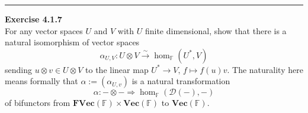 \documentclass[a4paper, 12pt]{article}
\newenvironment{problem}[2][Exercise]
    { \begin{mdframed}[backgroundcolor=gray!20] \textbf{#1 #2} \\}
    {  \end{mdframed}}
\begin{document}
\noindent\rule{7in}{2.8pt}
\begin{problem}{4.1.7}
For any vector spaces \(U\) and \(V\) with \(U\) finite dimensional, show that there is a natural isomorphism of vector spaces
\[\alpha_{U,V}:U\otimes V\xrightarrow{\sim} \hom_{\mathbb{F}}(U^*,V) \]
sending \(u\otimes v\in U\otimes V\) to the linear map \(U^*\rightarrow V,\, f\mapsto f(u)v\). The naturality here means formally that \(\alpha:=(\alpha_{U,v})\) is a 
natural transformation
\[\alpha:-\otimes -\Rightarrow \hom_{\mathbb{F}}(\mathcal{D}(-),-)\]
of bifunctors from \(\mathbf{FVec}(\mathbb{F})\times \mathbf{Vec}(\mathbb{F})\) to \(\mathbf{Vec}(\mathbb{F})\).	
\end{problem}
\end{document}
